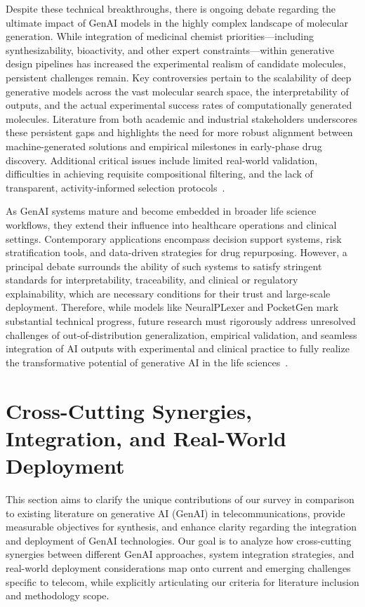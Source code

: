 \documentclass[sigconf]{acmart}
\begin{document}
Despite these technical breakthroughs, there is ongoing debate regarding the ultimate impact of GenAI models in the highly complex landscape of molecular generation. While integration of medicinal chemist priorities---including synthesizability, bioactivity, and other expert constraints---within generative design pipelines has increased the experimental realism of candidate molecules, persistent challenges remain. Key controversies pertain to the scalability of deep generative models across the vast molecular search space, the interpretability of outputs, and the actual experimental success rates of computationally generated molecules. Literature from both academic and industrial stakeholders underscores these persistent gaps and highlights the need for more robust alignment between machine-generated solutions and empirical milestones in early-phase drug discovery. Additional critical issues include limited real-world validation, difficulties in achieving requisite compositional filtering, and the lack of transparent, activity-informed selection protocols~\cite{ref6}.

As GenAI systems mature and become embedded in broader life science workflows, they extend their influence into healthcare operations and clinical settings. Contemporary applications encompass decision support systems, risk stratification tools, and data-driven strategies for drug repurposing. However, a principal debate surrounds the ability of such systems to satisfy stringent standards for interpretability, traceability, and clinical or regulatory explainability, which are necessary conditions for their trust and large-scale deployment. Therefore, while models like NeuralPLexer and PocketGen mark substantial technical progress, future research must rigorously address unresolved challenges of out-of-distribution generalization, empirical validation, and seamless integration of AI outputs with experimental and clinical practice to fully realize the transformative potential of generative AI in the life sciences~\cite{ref6,ref26}.

\section{Cross-Cutting Synergies, Integration, and Real-World Deployment}

This section aims to clarify the unique contributions of our survey in comparison to existing literature on generative AI (GenAI) in telecommunications, provide measurable objectives for synthesis, and enhance clarity regarding the integration and deployment of GenAI technologies. Our goal is to analyze how cross-cutting synergies between different GenAI approaches, system integration strategies, and real-world deployment considerations map onto current and emerging challenges specific to telecom, while explicitly articulating our criteria for literature inclusion and methodology scope.
\end{document}
